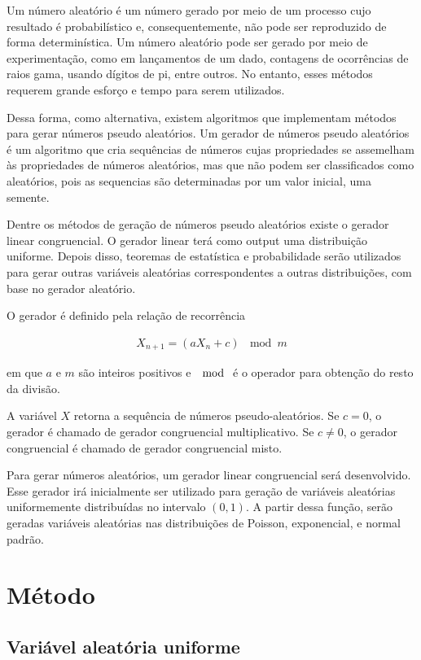 \documentclass[
]{article}
\begin{document}
Um número aleatório é um número gerado por meio de um processo cujo
resultado é probabilístico e, consequentemente, não pode ser reproduzido
de forma determinística. Um número aleatório pode ser gerado por meio de
experimentação, como em lançamentos de um dado, contagens de ocorrências
de raios gama, usando dígitos de pi, entre outros. No entanto, esses
métodos requerem grande esforço e tempo para serem utilizados.

Dessa forma, como alternativa, existem algoritmos que implementam
métodos para gerar números pseudo aleatórios. Um gerador de números
pseudo aleatórios é um algoritmo que cria sequências de números cujas
propriedades se assemelham às propriedades de números aleatórios, mas
que não podem ser classificados como aleatórios, pois as sequencias são
determinadas por um valor inicial, uma semente.

Dentre os métodos de geração de números pseudo aleatórios existe o
gerador linear congruencial. O gerador linear terá como output uma
distribuição uniforme. Depois disso, teoremas de estatística e
probabilidade serão utilizados para gerar outras variáveis aleatórias
correspondentes a outras distribuições, com base no gerador aleatório.

O gerador é definido pela relação de recorrência

\begin{align}
  X_{n+1} = \left( aX_n + c \right) \, \mod m 
\end{align}

em que \(a\) e \(m\) são inteiros positivos e \(\mod\) é o operador para
obtenção do resto da divisão.

A variável \(X\) retorna a sequência de números pseudo-aleatórios. Se
\(c = 0\), o gerador é chamado de gerador congruencial multiplicativo.
Se \(c \neq 0\), o gerador congruencial é chamado de gerador
congruencial misto.

Para gerar números aleatórios, um gerador linear congruencial será
desenvolvido. Esse gerador irá inicialmente ser utilizado para geração
de variáveis aleatórias uniformemente distribuídas no intervalo
\((0,1)\). A partir dessa função, serão geradas variáveis aleatórias nas
distribuições de Poisson, exponencial, e normal padrão.

\hypertarget{muxe9todo}{%
\section{Método}\label{muxe9todo}}

\hypertarget{variuxe1vel-aleatuxf3ria-uniforme}{%
\subsection{Variável aleatória
uniforme}\label{variuxe1vel-aleatuxf3ria-uniforme}}
\end{document}
